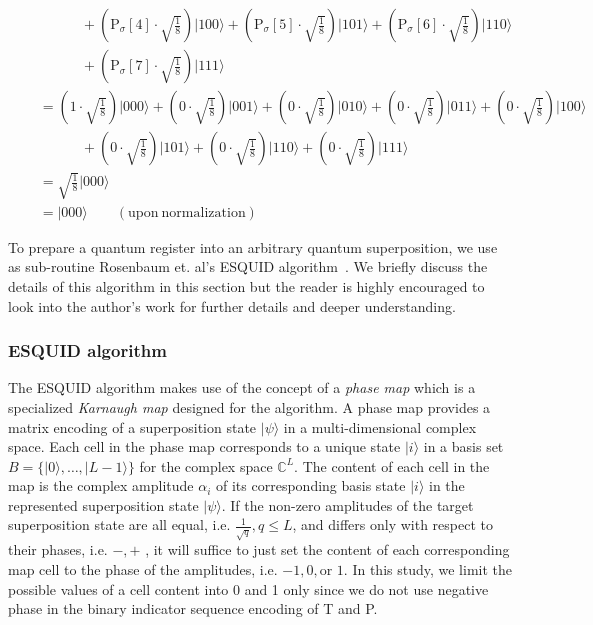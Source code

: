 \begin{example}
\begin{align*}
	\quad & \quad \quad \quad + \left(\mathrm{P}_{\sigma}[4] \cdot \sqrt{\frac{1}{8}} \right) \vert 100 \rangle + \left( \mathrm{P}_{\sigma}[5] \cdot \sqrt{\frac{1}{8}} \right) \vert 101 \rangle + \left( \mathrm{P}_{\sigma}[6] \cdot \sqrt{\frac{1}{8}} \right) \vert 110 \rangle\\
	\quad & \quad\quad\quad + \left( \mathrm{P}_{\sigma}[7] \cdot \sqrt{\frac{1}{8}} \right) \vert 111 \rangle \\
	\quad &= \left(1 \cdot \sqrt{\frac{1}{8}}\right) \vert 000 \rangle + \left(0 \cdot \sqrt{\frac{1}{8}} \right) \vert 001 \rangle + \left( 0 \cdot \sqrt{\frac{1}{8}}\right) \vert 010 \rangle + \left( 0 \cdot \sqrt{\frac{1}{8}}\right) \vert 011 \rangle  + \left( 0 \cdot \sqrt{\frac{1}{8}}\right) \vert 100 \rangle\\
	\quad & \quad \quad \quad + \left( 0 \cdot \sqrt{\frac{1}{8}}\right) \vert 101 \rangle + \left( 0 \cdot \sqrt{\frac{1}{8}}\right) \vert 110 \rangle + \left( 0 \cdot \sqrt{\frac{1}{8}}\right) \vert 111 \rangle \\
	&= \sqrt{\frac{1}{8}} \vert 000 \rangle\\
	&= \vert 000 \rangle \quad\quad \mathrm{(upon\ normalization)}
\end{align*} 
\end{example}

To prepare a quantum register into an arbitrary quantum superposition, we use as sub-routine Rosenbaum et. al's ESQUID algorithm~\cite{Rosenbaum2009}. We briefly discuss the details of this algorithm in this section but the reader is highly encouraged to look into the author's work for further details and deeper understanding.

\subsubsection{ESQUID algorithm}
The ESQUID algorithm makes use of the concept of a \textit{phase map} which is a specialized \textit{Karnaugh map} designed for the algorithm. A phase map provides a matrix encoding of a superposition state $\vert \psi \rangle$ in a multi-dimensional complex space. Each cell in the phase map corresponds to a unique state $\vert i \rangle$ in a basis set $B=\{\vert 0 \rangle, \ldots, \vert L - 1 \rangle \}$ for the complex space $\mathbb{C}^{L}$. The content of each cell in the map is the complex amplitude $\alpha_i$ of its corresponding basis state $\vert i \rangle$ in the represented superposition state $\vert \psi \rangle$. If the non-zero amplitudes of the target superposition state are all equal, i.e. $\frac{1}{\sqrt{q}}, q \leq L$, and differs only with respect to their phases, i.e. $-,+$ , it will suffice to just set the content of each corresponding map cell to the phase of the amplitudes, i.e. $-1, 0, \text{or } 1$. In this study, we limit the possible values of a cell content into 0 and 1 only since we do not use negative phase in the binary indicator sequence encoding of T and P.

